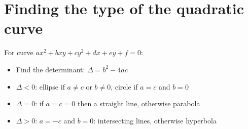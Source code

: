 \section{Finding the type of the quadratic curve}
For curve $ax^2+bxy+cy^2+dx+ey+f=0$:
\begin{itemize}
    \item Find the determinant: $\Delta = b^2-4ac$
    \item $\Delta<0$: ellipse if $a\neq c$ or $b\neq 0$, circle if $a=c$ and $b=0$
    \item $\Delta = 0$: if $a=c=0$ then a straight line, otherwise parabola
    \item $\Delta > 0$: $a=-c$ and $b=0$: intersecting lines, otherwise hyperbola 
\end{itemize}